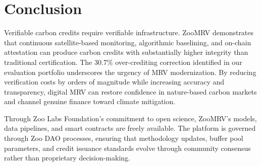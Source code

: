 \section{Conclusion}

\label{sec:conclusion}

Verifiable carbon credits require verifiable infrastructure. ZooMRV
demonstrates that continuous satellite-based monitoring, algorithmic
baselining, and on-chain attestation can produce carbon credits with
substantially higher integrity than traditional certification. The
30.7\% over-crediting correction identified in our evaluation portfolio
underscores the urgency of MRV modernization. By reducing verification
costs by orders of magnitude while increasing accuracy and transparency,
digital MRV can restore confidence in nature-based carbon markets and
channel genuine finance toward climate mitigation.

Through Zoo Labs Foundation's commitment to open science, ZooMRV's
models, data pipelines, and smart contracts are freely available. The
platform is governed through Zoo DAO processes, ensuring that
methodology updates, buffer pool parameters, and credit issuance
standards evolve through community consensus rather than proprietary
decision-making.




